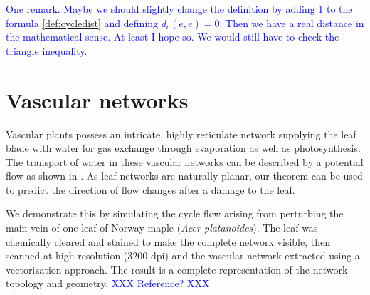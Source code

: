 \documentclass[10pt,aps,pra,twocolumn,superscriptaddress]{revtex4-1}
\newcommand{\dirk}[1]{\textcolor{blue}{#1}}
\begin{document}
\dirk{One remark. Maybe we should slightly change the definition by adding 1 to the formula
\ref{def:cycledist} and defining $d_c(e,e) = 0$. Then we have a real distance in the mathematical 
sense. At least I hope so. We would still have to check the triangle inequality.}


\section{Vascular networks}


Vascular plants possess an intricate, highly reticulate network 
supplying the leaf blade with water for gas exchange through
evaporation as well as photosynthesis.
The transport of water in these vascular networks can be described by a 
potential flow as shown in \cite{Kati10}.
As leaf networks are naturally planar, our theorem can be 
used to predict the direction of flow changes after a damage to the leaf.

We demonstrate this by simulating the cycle flow arising from perturbing
the main vein of one leaf of Norway maple (\emph{Acer platanoides}).
The leaf was chemically cleared and stained to make the complete network
visible, then scanned at high resolution (3200 dpi) and the vascular
network extracted using a vectorization approach. The result is a
complete representation of the network topology and geometry.
\dirk{XXX Reference? XXX}
\end{document}
